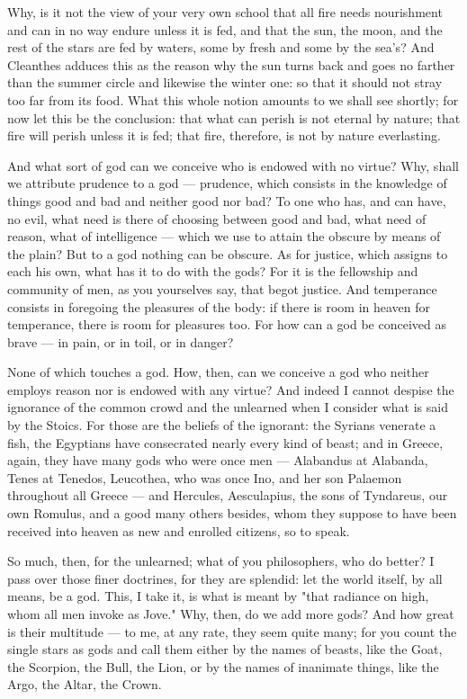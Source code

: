  Why, is it not the view of your very own school that all fire needs nourishment and can in no way endure unless it is fed, and that the sun, the moon, and the rest of the stars are fed by waters, some by fresh and some by the sea's? And Cleanthes adduces this as the reason why the sun turns back and goes no farther than the summer circle and likewise the winter one: so that it should not stray too far from its food. What this whole notion amounts to we shall see shortly; for now let this be the conclusion: that what can perish is not eternal by nature; that fire will perish unless it is fed; that fire, therefore, is not by nature everlasting.

 And what sort of god can we conceive who is endowed with no virtue? Why, shall we attribute prudence to a god — prudence, which consists in the knowledge of things good and bad and neither good nor bad? To one who has, and can have, no evil, what need is there of choosing between good and bad, what need of reason, what of intelligence — which we use to attain the obscure by means of the plain? But to a god nothing can be obscure. As for justice, which assigns to each his own, what has it to do with the gods? For it is the fellowship and community of men, as you yourselves say, that begot justice. And temperance consists in foregoing the pleasures of the body: if there is room in heaven for temperance, there is room for pleasures too. For how can a god be conceived as brave — in pain, or in toil, or in danger?

 None of which touches a god. How, then, can we conceive a god who neither employs reason nor is endowed with any virtue? And indeed I cannot despise the ignorance of the common crowd and the unlearned when I consider what is said by the Stoics. For those are the beliefs of the ignorant: the Syrians venerate a fish, the Egyptians have consecrated nearly every kind of beast; and in Greece, again, they have many gods who were once men — Alabandus at Alabanda, Tenes at Tenedos, Leucothea, who was once Ino, and her son Palaemon throughout all Greece — and Hercules, Aesculapius, the sons of Tyndareus, our own Romulus, and a good many others besides, whom they suppose to have been received into heaven as new and enrolled citizens, so to speak.

 So much, then, for the unlearned; what of you philosophers, who do better? I pass over those finer doctrines, for they are splendid: let the world itself, by all means, be a god. This, I take it, is what is meant by "that radiance on high, whom all men invoke as Jove." Why, then, do we add more gods? And how great is their multitude — to me, at any rate, they seem quite many; for you count the single stars as gods and call them either by the names of beasts, like the Goat, the Scorpion, the Bull, the Lion, or by the names of inanimate things, like the Argo, the Altar, the Crown.


